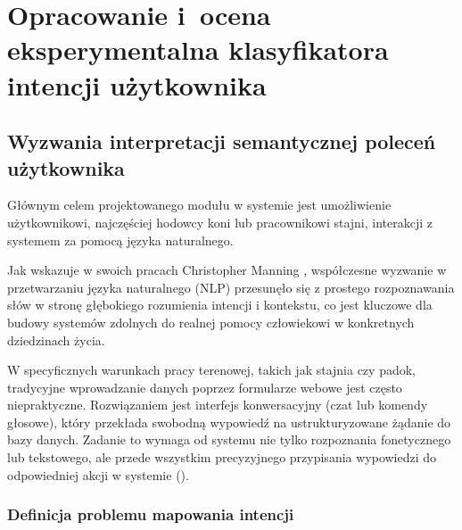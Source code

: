 \chapter{Opracowanie i~ocena eksperymentalna klasyfikatora intencji użytkownika} \label{sec:klasyfikator}
\label{chapters:05-Klasyfikator_intencji}

\section{Wyzwania interpretacji semantycznej poleceń użytkownika}

Głównym celem projektowanego modułu  w systemie  jest umożliwienie użytkownikowi, najczęściej hodowcy koni lub pracownikowi stajni, interakcji z systemem za pomocą języka naturalnego. 

Jak wskazuje w swoich pracach Christopher Manning \cite{manning2008}, współczesne wyzwanie w przetwarzaniu języka naturalnego (NLP) przesunęło się z prostego rozpoznawania słów w stronę głębokiego rozumienia intencji i kontekstu, co jest kluczowe dla budowy systemów zdolnych do realnej pomocy człowiekowi w konkretnych dziedzinach życia.

W specyficznych warunkach pracy terenowej, takich jak stajnia czy padok, tradycyjne wprowadzanie danych poprzez formularze webowe jest często niepraktyczne. Rozwiązaniem jest interfejs konwersacyjny (czat lub komendy głosowe), który przekłada swobodną wypowiedź na ustrukturyzowane żądanie do bazy danych. Zadanie to wymaga od systemu nie tylko rozpoznania fonetycznego lub tekstowego, ale przede wszystkim precyzyjnego przypisania wypowiedzi do odpowiedniej akcji w systemie ().

\subsection*{Definicja problemu mapowania intencji}

